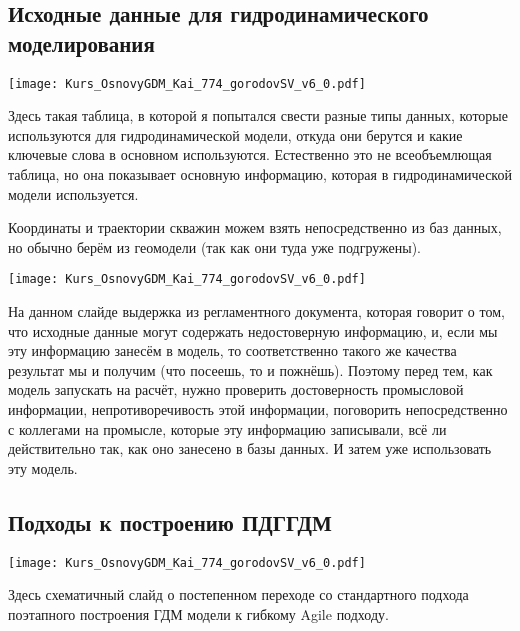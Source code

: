 \documentclass[main.tex]{subfiles}
\begin{document}
\subsection{Исходные данные для гидродинамического моделирования}

\texttt{[image: Kurs\_OsnovyGDM\_Kai\_774\_gorodovSV\_v6\_0.pdf]}

Здесь такая таблица, в которой я попытался свести разные типы данных, которые используются для гидродинамической модели, откуда они берутся и какие ключевые слова в основном используются.
Естественно это не всеобъемлющая таблица, но она показывает основную информацию, которая в гидродинамической модели используется.

Координаты и траектории скважин можем взять непосредственно из баз данных, но обычно берём из геомодели (так как они туда уже подгружены).

\texttt{[image: Kurs\_OsnovyGDM\_Kai\_774\_gorodovSV\_v6\_0.pdf]}

На данном слайде выдержка из регламентного документа, которая говорит о том, что исходные данные могут содержать недостоверную информацию, и, если мы эту информацию занесём в модель, то соответственно такого же качества результат мы и получим (что посеешь, то и пожнёшь).
Поэтому перед тем, как модель запускать на расчёт, нужно проверить достоверность промысловой информации, непротиворечивость этой информации, поговорить непосредственно с коллегами на промысле, которые эту информацию записывали, всё ли действительно так, как оно занесено в базы данных.
И затем уже использовать эту модель.

\subsection{Подходы к построению ПДГГДМ}

\texttt{[image: Kurs\_OsnovyGDM\_Kai\_774\_gorodovSV\_v6\_0.pdf]}

Здесь схематичный слайд о постепенном переходе со стандартного подхода поэтапного построения ГДМ модели к гибкому Agile подходу.
\end{document}
